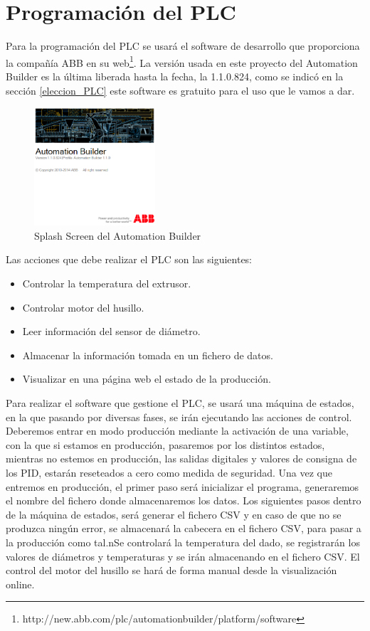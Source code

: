\section{Programación del PLC}
\label{sec:program.plc}

Para la programación del PLC se usará el software de desarrollo que proporciona la compañía ABB en su web\footnote{http://new.abb.com/plc/automationbuilder/platform/software}. La versión usada en este proyecto del Automation Builder es la última liberada hasta la fecha, la 1.1.0.824, como se indicó en la sección \ref{eleccion_PLC} este software es gratuito para el uso que le vamos a dar.\\
    \begin{figure}[H]
            \centering
            \includegraphics[width=0.4\textwidth]{images/PLC/ABB.png}
            \caption{Splash Screen del Automation Builder}
            \label{fig:PLC_splashabb}
    \end{figure}
Las acciones que debe realizar el PLC son las siguientes:

\begin{itemize}
	\item{Controlar la temperatura del extrusor.}
	\item{Controlar motor del husillo.}
	\item{Leer información del sensor de diámetro.}
	\item{Almacenar la información tomada en un fichero de datos.}
	\item{Visualizar en una página web el estado de la producción.}
\end{itemize}

Para realizar el software que gestione el PLC, se usará una máquina de estados, en la que pasando por diversas fases, se irán ejecutando las acciones de control. Deberemos entrar en modo producción mediante la activación de una variable, con la que si estamos en producción, pasaremos por los distintos estados, mientras no estemos en producción, las salidas digitales y valores de consigna de los PID, estarán reseteados a cero como medida de seguridad. Una vez que entremos en producción, el primer paso será inicializar el programa, generaremos el nombre del fichero donde almacenaremos los datos. Los siguientes pasos dentro de la máquina de estados, será generar el fichero CSV y en caso de que no se produzca ningún error, se almacenará la cabecera en el fichero CSV, para pasar a la producción como tal.nSe controlará la temperatura del dado, se registrarán los valores de diámetros y temperaturas y se irán almacenando en el fichero CSV. El control del motor del husillo se hará de forma manual desde la visualización online.\\

